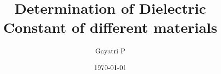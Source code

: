 \documentclass[reprint,amsmath,amssymb,aps]{revtex4-2}
\begin{document}
    \title{Determination of Dielectric Constant of different materials}

    \author{Gayatri P}
    \date{\today}

    
    \maketitle

    
    
    
    
    
    
    
    
    \nocite{*}
\end{document}

